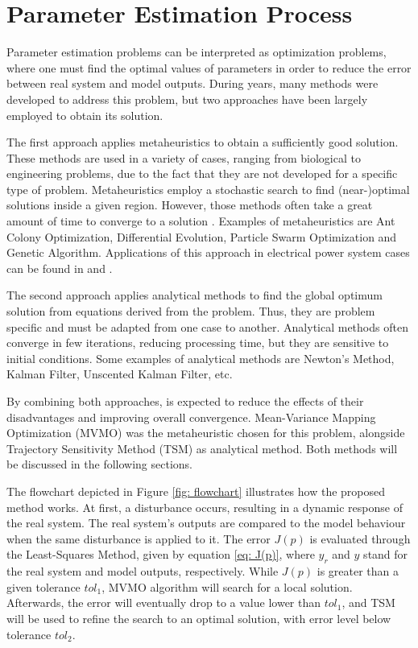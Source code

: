 \chapter{Parameter Estimation Process}

\label{ch: Estim}

Parameter estimation problems can be interpreted as optimization problems, where one must find the optimal values of parameters in order to reduce the error between real system and model outputs. During years, many methods were developed to address this problem, but two approaches have been largely employed to obtain its solution. 

The first approach applies metaheuristics to obtain a sufficiently good solution. These methods are used in a variety of cases, ranging from biological to engineering problems, due to the fact that they are not developed for a specific type of problem. Metaheuristics employ a stochastic search to find (near-)optimal solutions inside a given region. However, those methods often take a great amount of time to converge to a solution \cite{Blum2003}. Examples of metaheuristics are Ant Colony Optimization, Differential Evolution, Particle Swarm Optimization and Genetic Algorithm. Applications of this approach in electrical power system cases can be found in \cite{Todorovski2006} and \cite{Yoshida2000}.

The second approach applies analytical methods to find the global optimum solution from equations derived from the problem. Thus, they are problem specific and must be adapted from one case to another. Analytical methods often converge in few iterations, reducing processing time, but they are sensitive to initial conditions. Some examples of analytical methods are Newton's Method, Kalman Filter, Unscented Kalman Filter, etc.

By combining both approaches, is expected to reduce the effects of their disadvantages and improving overall convergence. Mean-Variance Mapping Optimization (MVMO) was the metaheuristic chosen for this problem, alongside Trajectory Sensitivity Method (TSM) as analytical method. Both methods will be discussed in the following sections.

The flowchart depicted in Figure \ref{fig: flowchart} illustrates how the proposed method works. At first, a disturbance occurs, resulting in a dynamic response of the real system. The real system's outputs are compared to the model behaviour when the same disturbance is applied to it. The error $J(p)$ is evaluated through the Least-Squares Method, given by equation \eqref{eq: J(p)}, where $y_{r}$ and $y$ stand for the real system and model outputs, respectively. While $J(p)$ is greater than a given tolerance $tol_{1}$, MVMO algorithm will search for a local solution. Afterwards, the error will eventually drop to a value lower than $tol_{1}$, and TSM will be used to refine the search to an optimal solution, with error level below tolerance $tol_{2}$.

